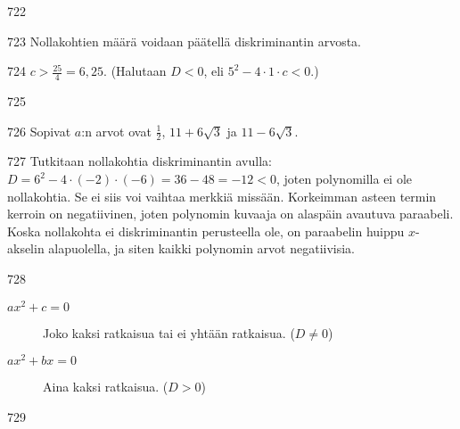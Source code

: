 \begin{Vastaus}{722}
	
\end{Vastaus}
\begin{Vastaus}{723}
	Nollakohtien määrä voidaan päätellä diskriminantin arvosta.
	
\end{Vastaus}
\begin{Vastaus}{724}
		 $c> \frac{25}{4} =6,25$. (Halutaan $D < 0$, eli $5^2-4\cdot 1 \cdot c <0$.)
	
\end{Vastaus}
\begin{Vastaus}{725}
	
\end{Vastaus}
\begin{Vastaus}{726}
		Sopivat $a$:n arvot ovat $\frac{1}{2}$, $11+6\sqrt{3}$ ja $11-6\sqrt{3}$.
	
\end{Vastaus}
\begin{Vastaus}{727}
	Tutkitaan nollakohtia diskriminantin avulla: $D=6^2-4\cdot (-2)\cdot(-6)=36-48=-12<0$, joten polynomilla ei ole nollakohtia. Se ei siis voi vaihtaa merkkiä missään. Korkeimman asteen termin kerroin on negatiivinen, joten polynomin kuvaaja on alaspäin avautuva paraabeli. Koska nollakohta ei diskriminantin perusteella ole, on paraabelin huippu $x$-akselin alapuolella, ja siten kaikki polynomin arvot negatiivisia.
	
\end{Vastaus}
\begin{Vastaus}{728}
		\begin{description}
			\item[$ax^2+c=0$] Joko kaksi ratkaisua tai ei yhtään ratkaisua. ($D \neq 0$)
			\item[$ax^2+bx=0$] Aina kaksi ratkaisua. ($D > 0$)
		\end{description}
	
\end{Vastaus}
\begin{Vastaus}{729}
	
\end{Vastaus}
